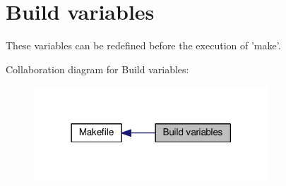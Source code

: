 \hypertarget{group___build___variables}{\section{Build variables}
\label{group___build___variables}
}


These variables can be redefined before the execution of 'make'.  


Collaboration diagram for Build variables\+:
\nopagebreak
\begin{figure}[H]
\begin{center}
\leavevmode
\includegraphics[width=249pt]{group___build___variables}
\end{center}
\end{figure}
